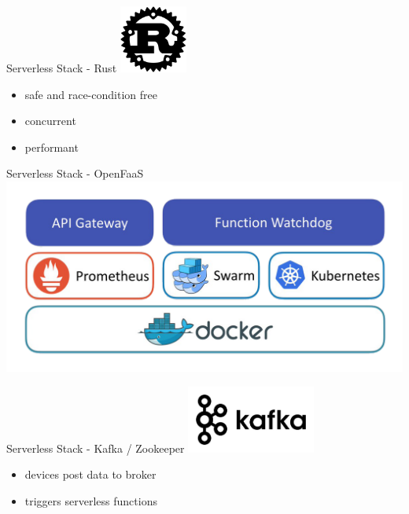 \documentclass[aspectratio=1610]{beamer}
\begin{document}
  \begin{frame}{Serverless Stack - Rust}
    \includegraphics[height=6em]{rust-logo}

    \vspace*{1.5em}

    \begin{itemize}
      \item safe and race-condition free
      \item concurrent
      \item performant
    \end{itemize}
  \end{frame}

  \begin{frame}{Serverless Stack - OpenFaaS}
    \includegraphics[width=\textwidth]{openfaas-stack}
  \end{frame}

  \begin{frame}{Serverless Stack - Kafka / Zookeeper}
    \includegraphics[height=6em]{kafka-logo}

    \vspace*{1.5em}

    \begin{itemize}
      \item devices post data to broker
      \item triggers serverless functions
    \end{itemize}
  \end{frame}
\end{document}
